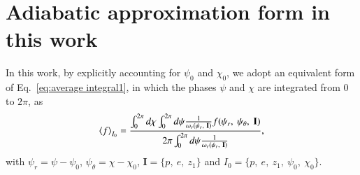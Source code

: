\documentclass[aps,prx,reprint,superscriptaddress,nofootinbib,longbibliography]{revtex4-1}
\begin{document}
\section{Adiabatic approximation form in this work}\label{appendix:average Integral2}
In this work, by explicitly accounting for $\psi_{0}$ and $\chi_{0}$, we adopt an equivalent form of Eq.~\eqref{eq:average integral1}, in which the phases $\psi$ and $\chi$ are integrated from $0$ to $2\pi$, as
\begin{equation}
    \expval{f}_{I_{0}}=\frac{\int_{0}^{2\pi}d\chi\int_{0}^{2\pi}d\psi\frac{1}{\omega_{r}(\psi_{r},\ \mathbf{I})}f(\psi_{r},\ \psi_{\theta},\ \mathbf{I})}{2\pi\int_{0}^{2\pi}d\psi\frac{1}{\omega_{r}(\psi_{r},\ \mathbf{I})}},
    \label{eq:average integral2}
\end{equation}
with $\psi_{r}=\psi-\psi_{0}$, $\psi_{\theta}=\chi-\chi_{0}$, $\mathbf{I}=\{p,\ e,\ z_{1}\}$ and $I_{0}=\{p,\ e,\ z_{1},\ \psi_{0},\ \chi_{0}\}$. 



\end{document}
